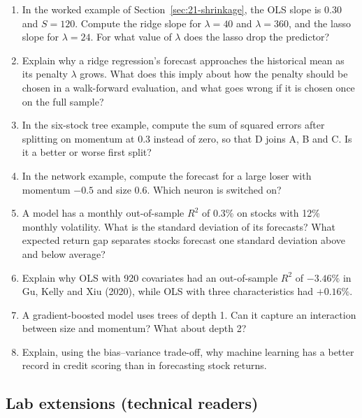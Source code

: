 \begin{enumerate}
  \item In the worked example of Section~\ref{sec:21-shrinkage}, the OLS slope is 0.30 and $S = 120$. Compute the ridge slope for $\lambda = 40$ and $\lambda = 360$, and the lasso slope for $\lambda = 24$. For what value of $\lambda$ does the lasso drop the predictor?
  \item Explain why a ridge regression's forecast approaches the historical mean as its penalty $\lambda$ grows. What does this imply about how the penalty should be chosen in a walk-forward evaluation, and what goes wrong if it is chosen once on the full sample?
  \item In the six-stock tree example, compute the sum of squared errors after splitting on momentum at $0.3$ instead of zero, so that D joins A, B and C. Is it a better or worse first split?
  \item In the network example, compute the forecast for a large loser with momentum $-0.5$ and size $0.6$. Which neuron is switched on?
  \item A model has a monthly out-of-sample $R^2$ of 0.3\% on stocks with 12\% monthly volatility. What is the standard deviation of its forecasts? What expected return gap separates stocks forecast one standard deviation above and below average?
  \item Explain why OLS with 920 covariates had an out-of-sample $R^2$ of $-3.46\%$ in Gu, Kelly and Xiu (2020), while OLS with three characteristics had $+0.16\%$.
  \item A gradient-boosted model uses trees of depth 1. Can it capture an interaction between size and momentum? What about depth 2?
  \item Explain, using the bias--variance trade-off, why machine learning has a better record in credit scoring than in forecasting stock returns.
\end{enumerate}

\subsection*{Lab extensions (technical readers)}

